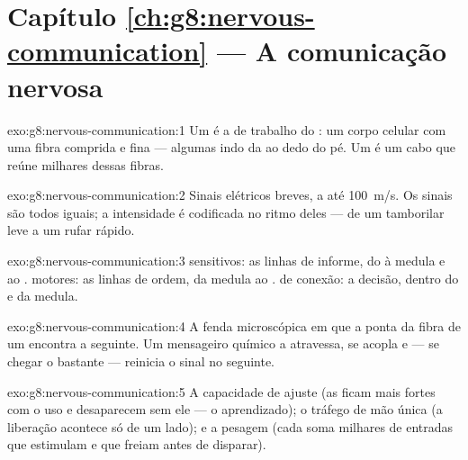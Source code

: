 \section*{Capítulo \ref{ch:g8:nervous-communication} --- A comunicação nervosa}

\begin{solution}{exo:g8:nervous-communication:1}
Um  é a  de trabalho do : um corpo
celular com uma fibra comprida e fina --- algumas indo da  ao
dedo do pé. Um  é um cabo que reúne milhares dessas fibras.
\end{solution}

\begin{solution}{exo:g8:nervous-communication:2}
Sinais elétricos breves, a até \qty{100}{m/s}. Os sinais são todos
iguais; a intensidade é codificada no ritmo deles --- de um tamborilar
leve a um rufar rápido.
\end{solution}

\begin{solution}{exo:g8:nervous-communication:3}
 sensitivos: as linhas de informe, do  à
medula e ao .  motores: as linhas de ordem, da medula
ao .  de conexão: a decisão, dentro do  e da
medula.
\end{solution}

\begin{solution}{exo:g8:nervous-communication:4}
A fenda microscópica em que a ponta da fibra de um  encontra a
 seguinte. Um mensageiro químico a atravessa, se acopla e --- se
chegar o bastante --- reinicia o sinal no  seguinte.
\end{solution}

\begin{solution}{exo:g8:nervous-communication:5}
A capacidade de ajuste (as  ficam mais fortes com o uso e
desaparecem sem ele --- o aprendizado); o tráfego de mão única (a
liberação acontece só de um lado); e a pesagem (cada  soma
milhares de entradas que estimulam e que freiam antes de disparar).
\end{solution}

